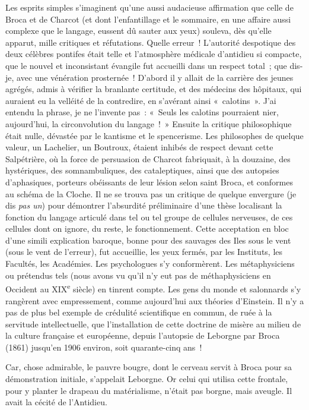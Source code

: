 \documentclass[french,twoside]{book} %
\begin{document}
Les esprits simples s’imaginent qu’une aussi audacieuse affirmation que celle de Broca et de Charcot (et dont l’enfantillage et le sommaire, en une affaire aussi complexe que le langage, eussent dû sauter aux yeux) souleva, dès qu’elle apparut, mille critiques et réfutations. Quelle erreur ! L’autorité despotique des deux célèbres pontifes était telle et l’atmosphère médicale d’antidieu si compacte, que le nouvel et inconsistant évangile fut accueilli dans un respect total ; que dis-je, avec une vénération prosternée ! D’abord il y allait de la carrière des jeunes agrégés, admis à vérifier la branlante certitude, et des médecins des hôpitaux, qui auraient eu la velléité de la contredire, en s’avérant ainsi « calotins ». J’ai entendu la phrase, je ne l’invente pas : « Seuls les calotins pourraient nier, aujourd’hui, la circonvolution du langage ! » Ensuite la critique philosophique était nulle, dévastée par le kantisme et le spencerisme. Les philosophes de quelque valeur, un Lachelier, un Boutroux, étaient inhibés de respect devant cette Salpétrière, où la force de persuasion de Charcot fabriquait, à la douzaine, des hystériques, des somnambuliques, des cataleptiques, ainsi que des autopsies d’aphasiques, porteurs obéissants de leur lésion selon saint Broca, et conformes au schéma de la Cloche. Il ne se trouva pas un critique de quelque envergure (je dis {\itshape pas un}) pour démontrer l’absurdité préliminaire d’une thèse localisant la fonction du langage articulé dans tel ou tel groupe de cellules nerveuses, de ces cellules dont on ignore, du reste, le fonctionnement. Cette acceptation en bloc d’une simili explication baroque, bonne pour des sauvages des Iles sous le vent (sous le vent de l’erreur), fut accueillie, les yeux fermés, par les Instituts, les Facultés, les Académies. Les psychologues s’y conformèrent. Les métaphysiciens ou prétendus tels (nous avons vu qu’il n’y eut pas de méthaphysiciens en Occident au XIX\textsuperscript{e} siècle) en tinrent compte. Les gens du monde et salonnards s’y rangèrent avec empressement, comme aujourd’hui aux théories d’Einstein. Il n’y a pas de plus bel exemple de crédulité scientifique en commun, de ruée à la servitude intellectuelle, que l’installation de cette doctrine de misère au milieu de la culture française et européenne, depuis l’autopsie de Leborgne par Broca (1861) jusqu’en 1906 environ, soit quarante-cinq ans !\par
Car, chose admirable, le pauvre bougre, dont le cerveau servit à Broca pour sa démonstration initiale, s’appelait Leborgne. Or celui qui utilisa cette frontale, pour y planter le drapeau du matérialisme, n’était pas borgne, mais aveugle. Il avait la cécité de l’Antidieu.\par
\end{document}
